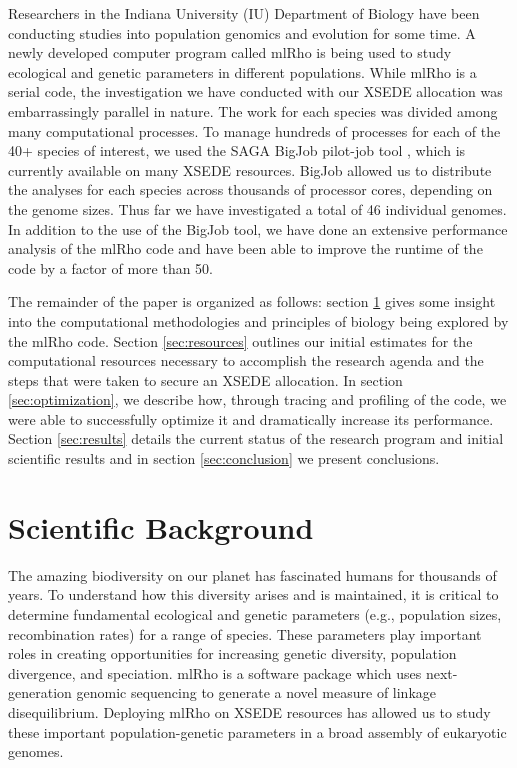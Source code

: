 \documentclass{sig-alternate}
\begin{document}
Researchers in the Indiana University (IU) Department of Biology have been conducting studies into population
genomics and evolution for some time. A newly developed computer program called mlRho \cite{MEC:MEC4482} is
being used to study ecological and genetic parameters in different populations. While mlRho is a serial code,
the investigation we have conducted with our XSEDE allocation was embarrassingly parallel in nature. The work
for each species was divided among many computational processes. To manage hundreds of processes for each of
the 40+ species of interest, we used the SAGA BigJob pilot-job tool \cite{bigjob_web}, which is
currently available on many XSEDE resources. BigJob allowed us to distribute the analyses for each species
across thousands of processor cores, depending on the genome sizes. Thus far we have
investigated a total of 46 individual genomes. In addition
to the use of the BigJob tool, we have done an extensive performance analysis of the mlRho code and have been able to improve the runtime of the code by a
factor of more than 50.

The remainder of the paper is organized as follows: section \ref{sec:background} gives some insight into the
computational methodologies and principles of biology being explored by the mlRho code. Section
\ref{sec:resources} outlines our initial estimates for the computational resources necessary to accomplish the
research agenda and the steps that were taken to secure an XSEDE allocation. In section \ref{sec:optimization},
we describe how, through tracing and profiling of the code, we were able to successfully optimize it and
dramatically increase its performance. Section \ref{sec:results} details the current status of the research
program and initial scientific results and in section \ref{sec:conclusion} we present conclusions.


\section{Scientific Background}\label{sec:background}
The amazing biodiversity on our planet has fascinated humans for thousands of years. To understand how this diversity arises and is maintained, it is critical to determine fundamental ecological and genetic parameters (e.g., population sizes, recombination rates) for a range of species. These parameters play important roles in creating opportunities for increasing genetic diversity, population divergence, and speciation. mlRho is a software package which uses next-generation genomic sequencing to generate a novel measure of linkage disequilibrium. Deploying mlRho on XSEDE resources has allowed us to study these important population-genetic parameters in a broad assembly of eukaryotic genomes.
\end{document}
